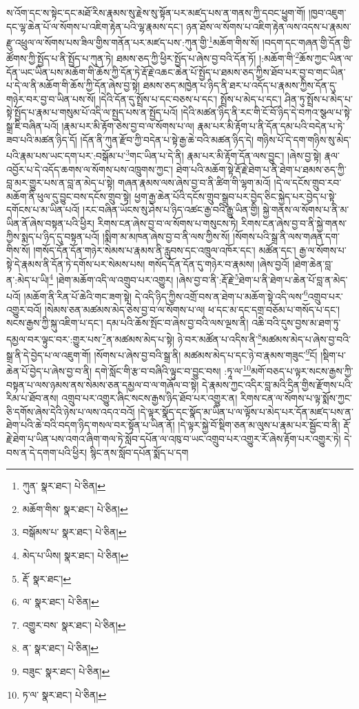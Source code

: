 ས་འོག་དང་ས་སྟེང་དང་མཐོ་རིས་རྣམས་སུ་རྗེས་སུ་སྟོན་པར་མཛད་པས་ན་གནས་ཀྱི་དབང་ཕྱུག་གོ། །ཁྱབ་འཇུག་དང་ལྷ་ཆེན་པོ་ལ་སོགས་པ་འཇིག་རྟེན་པའི་ལྷ་རྣམས་དང་། ཉན་ཐོས་ལ་སོགས་པ་འཇིག་རྟེན་ལས་འདས་པ་རྣམས་རྫུ་འཕྲུལ་ལ་སོགས་པས་ཟིལ་གྱིས་གནོན་པར་མཛད་པས་:ཀུན་གྱི་\footnote{ཀུན་  སྣར་ཐང་།  པེ་ཅིན། }མཆོག་གིས་སོ། །བདག་དང་གཞན་གྱི་དོན་གྱི་ཚོགས་ཀྱི་སྤྱོད་པ་ནི་སྤྱོད་པ་ཀུན་ཏེ། ཐམས་ཅད་ཀྱི་ཕྱིར་སྤྱོད་པ་ཞེས་བྱ་བའི་དོན་ཏོ། །:མཆོག་གི་\footnote{མཆོག་གིས་  སྣར་ཐང་།  པེ་ཅིན། }ཆོས་ཀྱང་ཡིན་ལ་དོན་ཡང་ཡིན་པས་མཆོག་གི་ཆོས་ཀྱི་དོན་ཏེ་རྡོ་རྗེ་འཆང་ཆེན་པོ་སྤྱོད་པ་ཐམས་ཅད་ཀྱིས་ཐོབ་པར་བྱ་བ་གང་ཡིན་པ་དེ་ལ་ནི་མཆོག་གི་ཆོས་ཀྱི་དོན་ཞེས་བྱ་སྟེ། ཐམས་ཅད་མཁྱེན་པ་ཉིད་ནི་ཐར་པ་འདོད་པ་རྣམས་ཀྱིས་དོན་དུ་གཉེར་བར་བྱ་བ་ཡིན་པས་སོ། །དེའི་དོན་དུ་སྤྲོས་པ་དང་བཅས་པ་དང་། སྤྲོས་པ་མེད་པ་དང་། ཤིན་ཏུ་སྤྲོས་པ་མེད་པ་སྟེ་སྤྱོད་པ་རྣམ་པ་གསུམ་པོ་འདི་ལ་སྤྱད་པས་ན་སྤྱོད་པའོ། །དེའི་མཚན་ཉིད་ནི་རང་གི་ངོ་བོ་ཉིད་དེ་བཀའ་སྩལ་པ་སྟེ་སྒྲ་ཇི་བཞིན་པའོ། །རྣམ་པར་མི་རྟོག་ཅེས་བྱ་བ་ལ་སོགས་པ་ལ། རྣམ་པར་མི་རྟོག་པ་ནི་དོན་དམ་པའི་བདེན་པ་ཏེ་ཟབ་པའི་མཚན་ཉིད་དོ། །དོན་ནི་ཀུན་རྫོབ་ཀྱི་བདེན་པ་སྟེ་རྒྱ་ཆེ་བའི་མཚན་ཉིད་དེ། གཉིས་པོ་དེ་དག་གཉིས་སུ་མེད་པའི་རྣམ་པས་ཡང་དག་པར་:བསྒོམ་པ་\footnote{བསྒོམས་པ་  སྣར་ཐང་།  པེ་ཅིན། }གང་ཡིན་པ་དེ་ནི། རྣམ་པར་མི་རྟོག་དོན་ལས་བྱུང་། །ཞེས་བྱ་སྟེ། རྣལ་འབྱོར་པ་དེ་འདོད་ཆགས་ལ་སོགས་པས་འཁྲུགས་ཀྱང་། ཐེག་པའི་མཆོག་སྟེ་རྡོ་རྗེ་ཐེག་པ་ནི་ཐེག་པ་ཐམས་ཅད་ཀྱི་བླ་མར་གྱུར་པས་ན་བླ་ན་མེད་པ་སྟེ། གཞན་རྣམས་ལས་ཞེས་བྱ་བ་ནི་ཚིག་གི་ལྷག་མའོ། །དེ་ལ་དངོས་གྲུབ་རབ་མཆོག་ནི་ཕུལ་དུ་བྱུང་བས་དངོས་གྲུབ་སྟེ། ཕྱག་རྒྱ་ཆེན་པོའི་དངོས་གྲུབ་སྒྲུབ་པར་བྱེད་ཅིང་སྐྱེད་པར་བྱེད་པ་སྟེ་དགོངས་པ་མ་ཡིན་པའོ། །རང་བཞིན་ཡོངས་སུ་ཤེས་པ་ཉིད་འཚང་རྒྱ་བའི་རྒྱུ་ཡིན་གྱི། སྐྱེ་གནས་ལ་སོགས་པ་ནི་མ་ཡིན་ནོ་ཞེས་བསྟན་པའི་ཕྱིར། རིགས་ངན་ཞེས་བྱ་བ་ལ་སོགས་པ་གསུངས་ཏེ། རིགས་ངན་ཞེས་བྱ་བ་ནི་སྐྱེ་གནས་ཀྱིས་སྨད་པ་ཉིད་དུ་བསྟན་པའོ། །སྨིག་མ་མཁན་ཞེས་བྱ་བ་ནི་ལས་ཀྱིས་སོ། །སོགས་པའི་སྒྲ་ནི་ལས་གཞན་དག་གིས་སོ། །གསོད་དོན་དོན་གཉེར་སེམས་པ་རྣམས་ནི་རླུབས་དང་འཁྲུལ་འཁོར་དང་། མཚོན་དང་། རྒྱ་ལ་སོགས་པ་སྟེ་དེ་རྣམས་ནི་དོན་ཏེ་དགོས་པར་སེམས་པས། གསོད་དོན་དོན་དུ་གཉེར་བ་རྣམས། །ཞེས་བྱའོ། །ཐེག་ཆེན་བླ་ན་:མེད་པ་ཡི།\footnote{མེད་པ་ཡིས།  སྣར་ཐང་།  པེ་ཅིན། } །ཐེག་མཆོག་འདི་ལ་འགྲུབ་པར་འགྱུར། །ཞེས་བྱ་བ་ནི་:རྡོ་རྗེ་\footnote{རྡོ་  སྣར་ཐང་། }ཐེག་པ་ནི་ཐེག་པ་ཆེན་པོ་བླ་ན་མེད་པའོ། །མཆོག་ནི་རིན་པོ་ཆེའི་གང་ཟག་སྟེ། དེ་འདི་ཉིད་ཀྱིས་འགྲོ་བས་ན་ཐེག་པ་མཆོག་སྟེ་འདི་ལས་\footnote{ལ་  སྣར་ཐང་།  པེ་ཅིན། }འགྲུབ་པར་འགྱུར་བའོ། །སེམས་ཅན་མཚམས་མེད་ཅེས་བྱ་བ་ལ་སོགས་པ་ལ། ཕ་དང་མ་དང་དགྲ་བཅོམ་པ་གསོད་པ་དང་། སངས་རྒྱས་ཀྱི་སྐུ་འཇིག་པ་དང་། དམ་པའི་ཆོས་སྤོང་བ་ཞེས་བྱ་བའི་ལས་ལྔས་ནི། འཆི་བའི་དུས་བྱས་མ་ཐག་ཏུ་དམྱལ་བར་ལྟུང་བར་:གྱུར་པས་\footnote{འགྱུར་བས་  སྣར་ཐང་།  པེ་ཅིན། }ན་མཚམས་མེད་པ་སྟེ། ཉེ་བར་མཚོན་པ་འདིས་ནི་\footnote{ན་  སྣར་ཐང་།  པེ་ཅིན། }མཚམས་མེད་པ་ཞེས་བྱ་བའི་སྒྲ་ནི་དེ་བྱེད་པ་ལ་འཇུག་གོ། །སོགས་པ་ཞེས་བྱ་བའི་སྒྲ་ནི། མཚམས་མེད་པ་དང་ཉེ་བ་རྣམས་གཟུང་\footnote{བཟུང་  སྣར་ཐང་།  པེ་ཅིན། }ངོ། །སྡིག་པ་ཆེན་པོ་བྱེད་པ་ཞེས་བྱ་བ་ནི། དགེ་སློང་གི་རྩ་བ་བཞིའི་ལྟུང་བ་བྱུང་བས། :ཏཱ་ལ་\footnote{ཏ་ལ་  སྣར་ཐང་།  པེ་ཅིན། }མགོ་བཅད་པ་ལྟར་སངས་རྒྱས་ཀྱི་བསྟན་པ་ལས་ཉམས་ནས་སེམས་ཅན་དམྱལ་བ་ལ་གཞོལ་བ་སྟེ། དེ་རྣམས་ཀྱང་འདིར་བླ་མའི་དྲིན་གྱིས་རྫོགས་པའི་རིམ་པ་ཐོབ་ནས། འགྲུབ་པར་འགྱུར་ཞིང་སངས་རྒྱས་ཉིད་ཐོབ་པར་འགྱུར་ན། རིགས་ངན་ལ་སོགས་པ་ལྟ་སྨོས་ཀྱང་ཅི་དགོས་ཞེས་དེའི་ཉེས་པ་ལས་འདའ་བའོ། །དེ་ལྟར་སྣོད་དང་སྣོད་མ་ཡིན་པ་ལ་ལྟོས་པ་མེད་པར་དོན་མཛད་པས་ན་ཐེག་པའི་ཆེ་བའི་བདག་ཉིད་གསལ་བར་སྟོན་པ་ཡིན་ནོ། །དེ་ལྟར་སྐྱེ་བོ་སྡིག་ཅན་མ་ལུས་པ་རྣམ་པར་སྦྱོང་བ་ནི། རྡོ་རྗེ་ཐེག་པ་ཡིན་པས་འགའ་ཞིག་གལ་ཏེ་སློབ་དཔོན་ལ་འཁུ་བ་ཡང་འགྲུབ་པར་འགྱུར་རོ་ཞེས་རྟོག་པར་འགྱུར་ཏེ། དེ་བས་ན་དེ་དགག་པའི་ཕྱིར། སྙིང་ནས་སློབ་དཔོན་སྨོད་པ་དག 